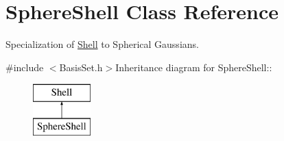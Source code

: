 \hypertarget{classJKBuilder_1_1SphereShell}{
\section{SphereShell Class Reference}
\label{classJKBuilder_1_1SphereShell}
}


Specialization of \hyperlink{classJKBuilder_1_1Shell}{Shell} to Spherical Gaussians.  


{\ttfamily \#include $<$BasisSet.h$>$}Inheritance diagram for SphereShell::\begin{figure}[H]
\begin{center}
\leavevmode
\includegraphics[height=2cm]{classJKBuilder_1_1SphereShell}
\end{center}
\end{figure}

